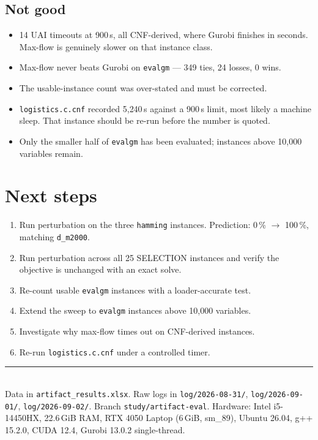 \documentclass[11pt,a4paper]{article}
\begin{document}
\subsection*{Not good}
\begin{itemize}[leftmargin=1.4em]
\item 14 UAI timeouts at 900\,s, all CNF-derived, where Gurobi finishes in seconds. Max-flow is
      genuinely slower on that instance class.
\item Max-flow never beats Gurobi on \texttt{evalgm} --- 349 ties, 24 losses, 0 wins.
\item The usable-instance count was over-stated and must be corrected.
\item \texttt{logistics.c.cnf} recorded 5{,}240\,s against a 900\,s limit, most likely a machine
      sleep. That instance should be re-run before the number is quoted.
\item Only the smaller half of \texttt{evalgm} has been evaluated; instances above 10{,}000
      variables remain.
\end{itemize}

\section{Next steps}

\begin{enumerate}[leftmargin=1.6em]
\item Run perturbation on the three \texttt{hamming} instances. Prediction: 0\,\% $\to$ 100\,\%,
      matching \texttt{d\_m2000}.
\item Run perturbation across all 25 SELECTION instances and verify the objective is unchanged with
      an exact solve.
\item Re-count usable \texttt{evalgm} instances with a loader-accurate test.
\item Extend the sweep to \texttt{evalgm} instances above 10{,}000 variables.
\item Investigate why max-flow times out on CNF-derived instances.
\item Re-run \texttt{logistics.c.cnf} under a controlled timer.
\end{enumerate}

\vspace{4mm}
\noindent\rule{\textwidth}{0.4pt}\\
\small
Data in \texttt{artifact\_results.xlsx}. Raw logs in \texttt{log/2026-08-31/},
\texttt{log/2026-09-01/}, \texttt{log/2026-09-02/}. Branch \texttt{study/artifact-eval}.
Hardware: Intel i5-14450HX, 22.6\,GiB RAM, RTX 4050 Laptop (6\,GiB, sm\_89), Ubuntu 26.04,
g++ 15.2.0, CUDA 12.4, Gurobi 13.0.2 single-thread.
\end{document}
